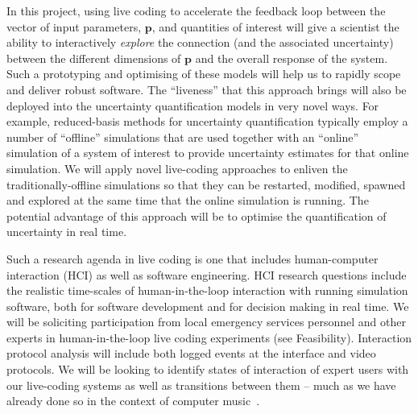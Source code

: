 In this project, using live coding to accelerate the feedback loop between the vector of input parameters,
$\mathbf{p}$,  and quantities of interest  will give a scientist the ability to interactively
\emph{explore} the connection (and the associated uncertainty) between
the different dimensions of $\mathbf{p}$ and the overall response of
the system. Such a prototyping and optimising of these models will help us to rapidly scope and deliver 
robust software. The ``liveness'' that this approach brings will also be deployed 
into the uncertainty quantification models in very novel ways. For example, reduced-basis methods for uncertainty 
quantification typically employ a number of ``offline'' simulations that are used together with an ``online'' simulation of 
a system of interest to provide uncertainty estimates for that online simulation. We will apply novel live-coding
approaches to enliven the traditionally-offline simulations so that they can be restarted, modified, spawned and 
explored at the same time that the online simulation is running. The potential advantage of this approach will be to 
optimise the quantification of uncertainty in real time. 



Such a research agenda in live coding is one that 
includes human-computer interaction (HCI) as well as software engineering. HCI research questions include the realistic time-scales of 
human-in-the-loop interaction with running simulation software, both for software development and for decision making in real time.
We will be soliciting participation from local emergency services personnel and other experts in human-in-the-loop live coding experiments (see Feasibility).
Interaction protocol analysis will include both logged events at the interface and 
video protocols. We will be looking to identify states of interaction 
of expert users with our live-coding systems as well as transitions between them -- much as we have already done so in the 
context of computer music~\parencite{swift2014coding}.\\







